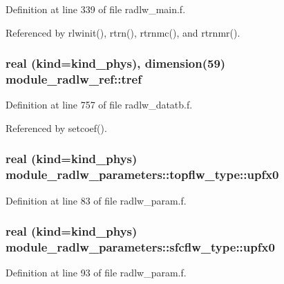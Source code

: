 Definition at line 339 of file radlw\+\_\+main.\+f.



Referenced by rlwinit(), rtrn(), rtrnmc(), and rtrnmr().

\subsubsection[{\texorpdfstring{tref}{tref}}]{\setlength{\rightskip}{0pt plus 5cm}real (kind=kind\+\_\+phys), dimension(59) module\+\_\+radlw\+\_\+ref\+::tref}\hypertarget{group__module__radlw__main_ga56972f3948052e8b7f4717c192fc551d}{}\label{group__module__radlw__main_ga56972f3948052e8b7f4717c192fc551d}


Definition at line 757 of file radlw\+\_\+datatb.\+f.



Referenced by setcoef().

\subsubsection[{\texorpdfstring{upfx0}{upfx0}}]{\setlength{\rightskip}{0pt plus 5cm}real (kind=kind\+\_\+phys) module\+\_\+radlw\+\_\+parameters\+::topflw\+\_\+type\+::upfx0}\hypertarget{group__module__radlw__main_ga7080fda1f732474077aeb302b57351cb}{}\label{group__module__radlw__main_ga7080fda1f732474077aeb302b57351cb}


Definition at line 83 of file radlw\+\_\+param.\+f.

\subsubsection[{\texorpdfstring{upfx0}{upfx0}}]{\setlength{\rightskip}{0pt plus 5cm}real (kind=kind\+\_\+phys) module\+\_\+radlw\+\_\+parameters\+::sfcflw\+\_\+type\+::upfx0}\hypertarget{group__module__radlw__main_gab186f43f5f87043de996c1fa6f59dc6e}{}\label{group__module__radlw__main_gab186f43f5f87043de996c1fa6f59dc6e}


Definition at line 93 of file radlw\+\_\+param.\+f.

